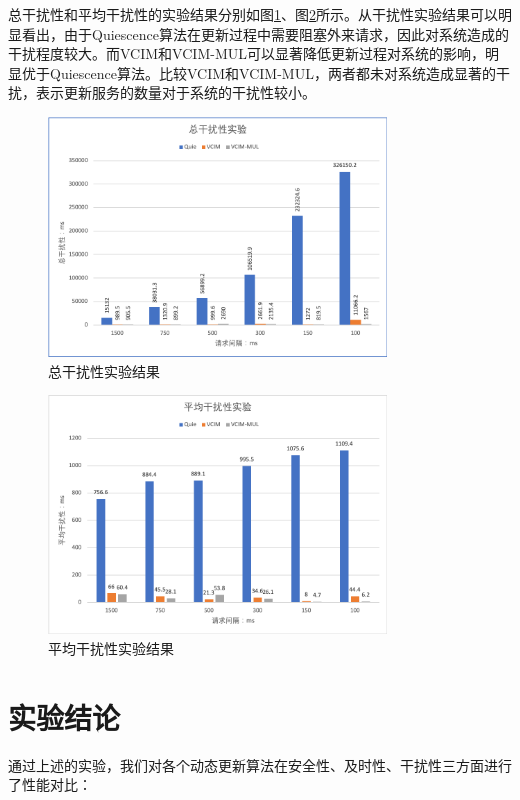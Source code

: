 \documentclass[macfonts,master]{njuthesis}
\begin{document}
总干扰性和平均干扰性的实验结果分别如图\ref{fig:total_disruption}、图\ref{fig:average_disruption}所示。从干扰性实验结果可以明显看出，由于Quiescence算法在更新过程中需要阻塞外来请求，因此对系统造成的干扰程度较大。而VCIM和VCIM-MUL可以显著降低更新过程对系统的影响，明显优于Quiescence算法。比较VCIM和VCIM-MUL，两者都未对系统造成显著的干扰，表示更新服务的数量对于系统的干扰性较小。

\begin{figure}[!htbp]
  \centering
  \includegraphics[width= 0.8\textwidth]{image/total_disruption.png}
  \caption{总干扰性实验结果}
  \label{fig:total_disruption}
\end{figure}

\begin{figure}[!htbp]
  \centering
  \includegraphics[width= 0.8\textwidth]{image/average_disruption.png}
  \caption{平均干扰性实验结果}
  \label{fig:average_disruption}
\end{figure}

\section{实验结论}
通过上述的实验，我们对各个动态更新算法在安全性、及时性、干扰性三方面进行了性能对比：
\end{document}
